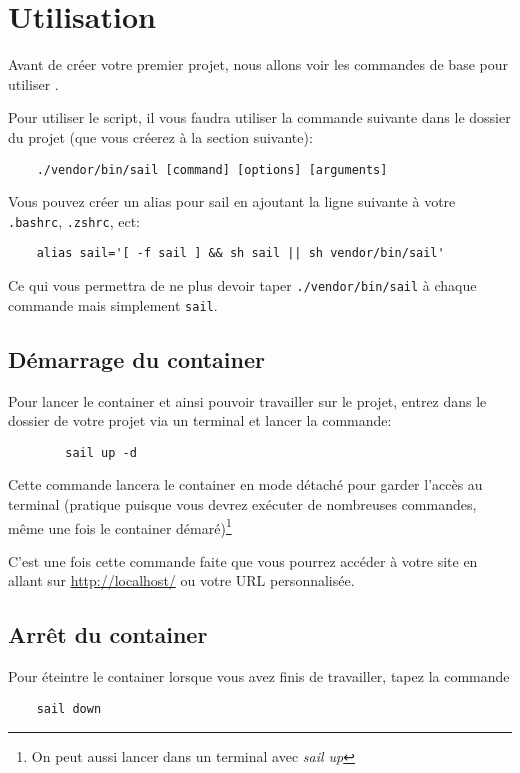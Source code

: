 \section[Utilisation]{Utilisation\label{sec:utilisation}}
Avant de créer votre premier projet, nous allons voir les commandes de base pour utiliser \laravelsail{}.

Pour utiliser le script, il vous faudra utiliser la commande suivante dans le dossier du projet (que vous créerez à la section suivante):

\begin{lstlisting}
    ./vendor/bin/sail [command] [options] [arguments]
\end{lstlisting}

Vous pouvez créer un alias pour sail en ajoutant la ligne suivante à votre \verb|.bashrc|, \verb|.zshrc|, ect: 

\begin{lstlisting}
    alias sail='[ -f sail ] && sh sail || sh vendor/bin/sail'
\end{lstlisting}

Ce qui vous permettra de ne plus devoir taper \verb|./vendor/bin/sail| à chaque commande mais simplement \verb|sail|.

\subsection[Démarrage du container]{Démarrage du container}
    Pour lancer le container et ainsi pouvoir travailler sur le projet, entrez dans le dossier de votre projet via un terminal et lancer la commande:
    
    \begin{lstlisting}
        sail up -d
    \end{lstlisting}

    Cette commande lancera le container en mode détaché pour garder l'accès au terminal (pratique puisque vous devrez exécuter de nombreuses commandes, même une fois le container démaré)\footnote{On peut aussi lancer dans un terminal avec \textit{sail up}}

    C'est une fois cette commande faite que vous pourrez accéder à votre site en allant sur \url{http://localhost/} ou votre URL personnalisée.

\subsection{Arrêt du container}

Pour éteintre le container lorsque vous avez finis de travailler, tapez la commande

\begin{lstlisting}
    sail down
\end{lstlisting}